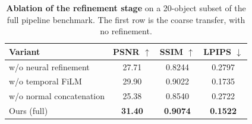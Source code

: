 \begin{table}[t]
  \centering
  \small
  \caption{\textbf{Ablation of the refinement stage} on a 20-object subset of the full pipeline
    benchmark. The first row is the coarse transfer, with no refinement.}
  \label{tab:ablation}
  \begin{tabular}{l c c c}
    \hline
    Variant & PSNR $\uparrow$ & SSIM $\uparrow$ & LPIPS $\downarrow$ \\
    \hline
    w/o neural refinement       & 27.71 & 0.8244 & 0.2797 \\
    w/o temporal FiLM           & 29.90 & 0.9022 & 0.1735 \\
    w/o normal concatenation    & 25.38 & 0.8540 & 0.2722 \\
    Ours (full)                 & \textbf{31.40} & \textbf{0.9074} & \textbf{0.1522} \\
    \hline
  \end{tabular}
\end{table}
